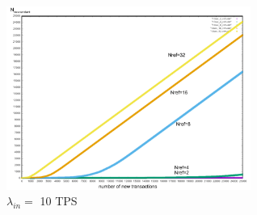 \documentclass[a4paper,10pt,twocolumn]{article}
\begin{document}
\begin{appendices}
	 \begin{figure}[H]
		\begin{center}
			\includegraphics[width=80mm]{10sec_ref.png}
			\caption{ $\lambda_{in}=$ 10 TPS}
		  \label{fig:sec10_ref}
		\end{center}
	 \end{figure}
	\end{appendices}
	 
	  
	
\end{document}

